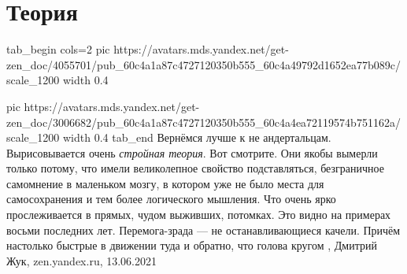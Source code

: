  
 
 
 
 
\chapter{Теория}

\ifcmt
tab_begin cols=2
  pic https://avatars.mds.yandex.net/get-zen_doc/4055701/pub_60c4a1a87c4727120350b555_60c4a49792d1652ea77b089c/scale_1200
	width 0.4

	pic https://avatars.mds.yandex.net/get-zen_doc/3006682/pub_60c4a1a87c4727120350b555_60c4a4ea72119574b751162a/scale_1200
	width 0.4
tab_end
\fi
Вернёмся лучше к не андертальцам. Вырисовывается очень \emph{стройная теория}.
Вот смотрите. Они якобы вымерли только потому, что имели великолепное свойство
подставляться, безграничное самомнение в маленьком мозгу, в котором уже не было
места для самосохранения и тем более логического мышления. Что очень ярко
прослеживается в прямых, чудом выживших, потомках. Это видно на примерах восьми
последних лет. Перемога-зрада — не останавливающиеся качели. Причём настолько
быстрые в движении туда и обратно, что голова кругом
, 
Дмитрий Жук, zen.yandex.ru, 13.06.2021 

